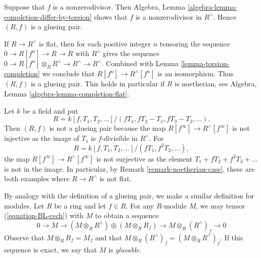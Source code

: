 \begin{remark}
\label{remark-BL-special-case}
Suppose that $f$ is a nonzerodivisor. Then
Algebra, Lemma \ref{algebra-lemma-completion-differ-by-torsion}
shows that $f$ is a nonzerodivisor in $R^\wedge$.
Hence $(R,f)$ is a glueing pair.
\end{remark}

\begin{remark}
\label{remark-noetherian-case}
If $R \to R^\wedge$ is flat, then for each positive integer $n$ tensoring
the sequence $0 \to R[f^n] \to R \to R$ with $R^\wedge$ gives the sequence
$0 \to R[f^n] \otimes_R R^\wedge \to R^\wedge \to R^\wedge$.
Combined with Lemma \ref{lemma-torsion-completion}
we conclude that $R[f^n] \to R^\wedge[f^n]$ is an isomorphism.
Thus $(R, f)$ is a glueing pair. 
This holds in particular if $R$ is noetherian, see
Algebra, Lemma \ref{algebra-lemma-completion-flat}.
\end{remark}

\begin{example}
\label{example-not-glueing-pair}
Let $k$ be a field and put
$$
R = k[f, T_1, T_2, \ldots]/(fT_1, fT_2 - T_1, fT_3 - T_2, \ldots).
$$
Then $(R,f)$ is not a glueing pair because the map
$R[f^\infty] \to R^\wedge[f^\infty]$ is not injective
as the image of $T_1$ is $f$-divisible in $R^\wedge$.
For
$$
R = k[f, T_1, T_2, \dots]/(fT_1, f^2T_2, \dots),
$$
the map $R[f^\infty] \to R^\wedge[f^\infty]$ is not surjective
as the element $T_1 + fT_2 + f^2 T_3 + \ldots$ is not in the image.
In particular, by
Remark \ref{remark-noetherian-case}, these are both examples where
$R \to R^\wedge$ is not flat.
\end{example}

\noindent
By analogy with the definition of a glueing pair, we make a similar definition 
for modules. Let $R$ be a ring and let $f \in R$. For any $R$-module $M$, we
may tensor (\ref{equation-BL-cech}) with $M$ to obtain a sequence
\begin{equation}
\label{equation-BL-cech-mod}
0 \to M \to (M \otimes_R R^\wedge) \oplus (M \otimes_R R_f) \to
M \otimes_R (R^\wedge)_f \to 0
\end{equation}
Observe that $M \otimes_R R_f = M_f$ and that
$M \otimes_R (R^\wedge)_f = (M \otimes_R R^\wedge)_f$.
If this sequence is exact, we say that $M$ is \emph{glueable}.

